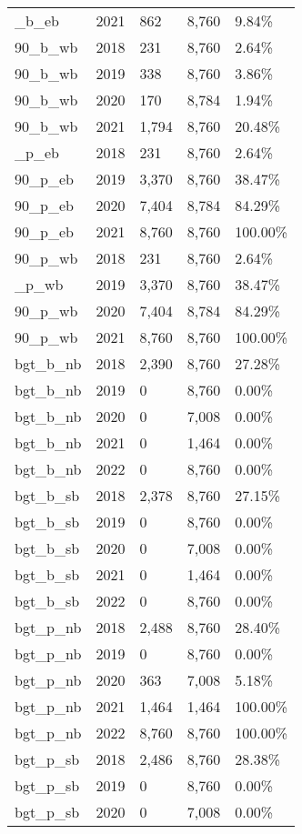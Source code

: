 \documentclass[
  letterpaper,
]{scrbook}
\begin{document}
\begin{longtable}[t]{lrlll}
\addlinespace
90\_b\_eb & 2021 & 862 & 8,760 & 9.84\%\\
90\_b\_wb & 2018 & 231 & 8,760 & 2.64\%\\
90\_b\_wb & 2019 & 338 & 8,760 & 3.86\%\\
90\_b\_wb & 2020 & 170 & 8,784 & 1.94\%\\
90\_b\_wb & 2021 & 1,794 & 8,760 & 20.48\%\\
\addlinespace
90\_p\_eb & 2018 & 231 & 8,760 & 2.64\%\\
90\_p\_eb & 2019 & 3,370 & 8,760 & 38.47\%\\
90\_p\_eb & 2020 & 7,404 & 8,784 & 84.29\%\\
90\_p\_eb & 2021 & 8,760 & 8,760 & 100.00\%\\
90\_p\_wb & 2018 & 231 & 8,760 & 2.64\%\\
\addlinespace
90\_p\_wb & 2019 & 3,370 & 8,760 & 38.47\%\\
90\_p\_wb & 2020 & 7,404 & 8,784 & 84.29\%\\
90\_p\_wb & 2021 & 8,760 & 8,760 & 100.00\%\\
bgt\_b\_nb & 2018 & 2,390 & 8,760 & 27.28\%\\
bgt\_b\_nb & 2019 & 0 & 8,760 & 0.00\%\\
\addlinespace
bgt\_b\_nb & 2020 & 0 & 7,008 & 0.00\%\\
bgt\_b\_nb & 2021 & 0 & 1,464 & 0.00\%\\
bgt\_b\_nb & 2022 & 0 & 8,760 & 0.00\%\\
bgt\_b\_sb & 2018 & 2,378 & 8,760 & 27.15\%\\
bgt\_b\_sb & 2019 & 0 & 8,760 & 0.00\%\\
\addlinespace
bgt\_b\_sb & 2020 & 0 & 7,008 & 0.00\%\\
bgt\_b\_sb & 2021 & 0 & 1,464 & 0.00\%\\
bgt\_b\_sb & 2022 & 0 & 8,760 & 0.00\%\\
bgt\_p\_nb & 2018 & 2,488 & 8,760 & 28.40\%\\
bgt\_p\_nb & 2019 & 0 & 8,760 & 0.00\%\\
\addlinespace
bgt\_p\_nb & 2020 & 363 & 7,008 & 5.18\%\\
bgt\_p\_nb & 2021 & 1,464 & 1,464 & 100.00\%\\
bgt\_p\_nb & 2022 & 8,760 & 8,760 & 100.00\%\\
bgt\_p\_sb & 2018 & 2,486 & 8,760 & 28.38\%\\
bgt\_p\_sb & 2019 & 0 & 8,760 & 0.00\%\\
\addlinespace
bgt\_p\_sb & 2020 & 0 & 7,008 & 0.00\%\\

\end{longtable}
\end{document}
